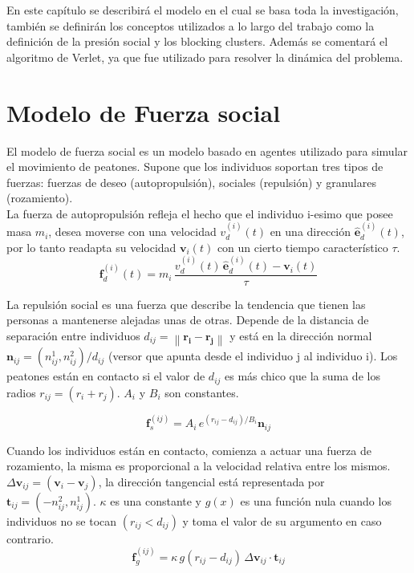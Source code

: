 
En este capítulo se describirá el modelo en el cual se basa toda la investigación, también se definirán los conceptos utilizados a lo largo del trabajo como la definición de la presión social y los blocking clusters. Además se comentará el algoritmo de Verlet, ya que fue utilizado para resolver la dinámica del problema. 

\section{\label{sfm}Modelo de Fuerza social}

El modelo de fuerza social es un modelo basado en agentes utilizado para simular el movimiento de peatones. Supone que los individuos soportan tres tipos de fuerzas: fuerzas de deseo (autopropulsión), sociales (repulsión) y granulares (rozamiento).  \\

La fuerza de autopropulsión refleja el hecho que el individuo i-esimo que posee masa $m_i$, desea  moverse con una velocidad $v_d^ {(i)}(t)$ en una dirección $\hat{\mathbf{e}}_d^ {(i)}(t)$, por lo tanto readapta su velocidad $\mathbf{v}_i(t)$ con un cierto tiempo característico $\tau$.
\begin{equation}
\mathbf{f}_d^ {(i)}(t)=m_i\,\displaystyle\frac{v_d^ {(i)}(t)\,\hat{\mathbf{e}}_d^ {(i)}(t)-\mathbf{v}_i(t)}{\tau}\label{fdeseo}
\end{equation}

La repulsión social es una fuerza que describe la tendencia que tienen las personas a mantenerse alejadas unas de otras. Depende de la distancia de separación entre individuos $d_{ij}=\left\|\mathbf{r_i}-\mathbf{r_j}\right\|$ y está en la dirección normal $\mathbf{n}_{ij}=(n_{ij}^1,n_{ij}^2)/d_{ij}$ (versor que apunta desde el individuo j al individuo i). Los peatones están en contacto si el valor de $d_{ij}$ es más chico que la suma de los radios $r_{ij}=(r_i+r_j)$. $A_i$ y 	$B_i$ son constantes.

\begin{equation}
\mathbf{f}_s^{(ij)}=A_i\,e^{(r_{ij}-d_{ij})/B_i}\mathbf{n}_{ij}\label{fsocial}
\end{equation} 

Cuando los individuos están en contacto, comienza a actuar una fuerza de rozamiento, la misma es proporcional a la velocidad relativa entre los mismos.  
$\Delta \mathbf{v}_{ij}=(\mathbf{v}_i-\mathbf{v}_j)$, la dirección tangencial está representada por $\mathbf{t}_{ij}=(-n_{ij}^2,n_{ij}^1)$.  $\kappa$ es una constante y $g(x)$ es una función nula cuando los individuos no se tocan $(r_{ij}<d_{ij})$ y toma el valor de su argumento en caso contrario. 
\begin{equation}
\mathbf{f}_g^{(ij)}=\kappa\,g(r_{ij}-d_{ij})\,\Delta \mathbf{v}_{ij}\cdot\mathbf{t}_{ij}\label{frozamiento}
\end{equation}


